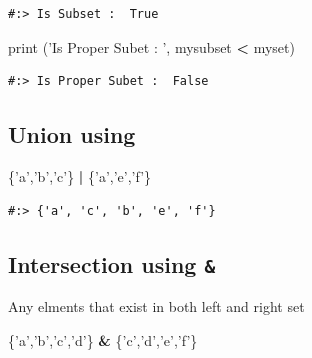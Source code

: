 \documentclass[
]{book}
\newenvironment{Shaded}{\begin{snugshade}}{\end{snugshade}}
\newcommand{\BuiltInTok}[1]{#1}
\newcommand{\NormalTok}[1]{#1}
\newcommand{\OperatorTok}[1]{\textcolor[rgb]{0.43,0.43,0.43}{\textbf{#1}}}
\newcommand{\StringTok}[1]{\textcolor[rgb]{0.5,0.5,0.5}{#1}}
\begin{document}
\begin{verbatim}
#:> Is Subset :  True
\end{verbatim}

\begin{Shaded}
\begin{Highlighting}[]
\BuiltInTok{print}\NormalTok{ (}\StringTok{'Is Proper Subet : '}\NormalTok{, mysubset }\OperatorTok{<}\NormalTok{ myset)}
\end{Highlighting}
\end{Shaded}

\begin{verbatim}
#:> Is Proper Subet :  False
\end{verbatim}

\hypertarget{union-using}{%
\subsection{\texorpdfstring{Union using \texttt{\textbar{}}}{Union using \textbar{}}}\label{union-using}}

\begin{Shaded}
\begin{Highlighting}[]
\NormalTok{\{}\StringTok{'a'}\NormalTok{,}\StringTok{'b'}\NormalTok{,}\StringTok{'c'}\NormalTok{\} }\OperatorTok{|}\NormalTok{ \{}\StringTok{'a'}\NormalTok{,}\StringTok{'e'}\NormalTok{,}\StringTok{'f'}\NormalTok{\}}
\end{Highlighting}
\end{Shaded}

\begin{verbatim}
#:> {'a', 'c', 'b', 'e', 'f'}
\end{verbatim}

\hypertarget{intersection-using}{%
\subsection{\texorpdfstring{Intersection using \texttt{\&}}{Intersection using \&}}\label{intersection-using}}

Any elments that exist in both left and right set

\begin{Shaded}
\begin{Highlighting}[]
\NormalTok{\{}\StringTok{'a'}\NormalTok{,}\StringTok{'b'}\NormalTok{,}\StringTok{'c'}\NormalTok{,}\StringTok{'d'}\NormalTok{\} }\OperatorTok{&}\NormalTok{ \{}\StringTok{'c'}\NormalTok{,}\StringTok{'d'}\NormalTok{,}\StringTok{'e'}\NormalTok{,}\StringTok{'f'}\NormalTok{\}}
\end{Highlighting}
\end{Shaded}
\end{document}
